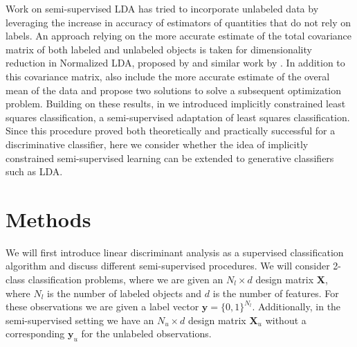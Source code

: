Work on semi-supervised LDA has tried to incorporate unlabeled data by leveraging the increase in accuracy of estimators of quantities that do not rely on labels. An approach relying on the more accurate estimate of the total covariance matrix of both labeled and unlabeled objects is taken for dimensionality reduction in Normalized LDA, proposed by \cite{Fan2008} and similar work by \cite{Cai2007}. In addition to this covariance matrix, \cite{Loog2014a} also include the more accurate estimate of the overal mean of the data and propose two solutions to solve a subsequent optimization problem. Building on these results, in \cite{Krijthe2015} we introduced implicitly constrained least squares classification, a semi-supervised adaptation of least squares classification. Since this procedure proved both theoretically and practically successful for a discriminative classifier, here we consider whether the idea of implicitly constrained semi-supervised learning can be extended to generative classifiers such as LDA.

\section{Methods}
We will first introduce linear discriminant analysis as a supervised classification algorithm and discuss different semi-supervised procedures. We will consider 2-class classification problems, where we are given an $N_l \times d$ design matrix $\mathbf{X}$, where $N_l$ is the number of labeled objects and $d$ is the number of features. For these observations we are given a label vector $\mathbf{y}=\{0,1\}^{N_l}$. Additionally, in the semi-supervised setting we have an $N_u \times d$ design matrix $\mathbf{X}_u$ without a corresponding $\mathbf{y}_u$ for the unlabeled observations.

